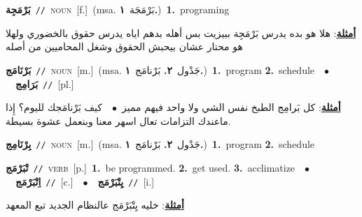 \documentclass[10pt,a4paper,twoside]{article} %
\begin{document}
\begin{multicols}{2}
{\setlength\topsep{0pt}\textbf{\foreignlanguage{arabic}{بَرْمَجِة}}\ {\color{gray}\texttt{//}\color{black}}\ \textsc{noun}\ [f.]\ \color{gray}(msa. \foreignlanguage{arabic}{بَرْمَجَة}~\foreignlanguage{arabic}{\textbf{١.}})\color{black}\ \textbf{1.}~programing\  \begin{flushright}\color{gray}\foreignlanguage{arabic}{\textbf{\underline{\foreignlanguage{arabic}{أمثلة}}}: هلا هو بده يدرس بَرْمَجِة ببيزيت بس أهله بدهم اياه يدرس حقوق بالخضوري ولهلا هو محتار عشان بيحبش الحقوق وشغل المحاميين من أصله}\end{flushright}\color{black}} \vspace{2mm}

{\setlength\topsep{0pt}\textbf{\foreignlanguage{arabic}{بَرْنَامَج}}\ {\color{gray}\texttt{//}\color{black}}\ \textsc{noun}\ [m.]\ \color{gray}(msa. \foreignlanguage{arabic}{جَدْول}~\foreignlanguage{arabic}{\textbf{٢.}}  \foreignlanguage{arabic}{بَرْنامَج}~\foreignlanguage{arabic}{\textbf{١.}})\color{black}\ \textbf{1.}~program  \textbf{2.}~schedule\ \ $\bullet$\ \ \setlength\topsep{0pt}\textbf{\foreignlanguage{arabic}{بَرَامِج}}\ {\color{gray}\texttt{//}\color{black}}\ [pl.]\  \begin{flushright}\color{gray}\foreignlanguage{arabic}{\textbf{\underline{\foreignlanguage{arabic}{أمثلة}}}: كل بَرامِج الطبخ نفس الشي ولا واحد فيهم مميز\ $\bullet$\ \  كيف بَرْنامَجك لليوم؟ إِذا ماعندك التزامات تعال اسهر معنا وبنعمل عشوة بسيطة.}\end{flushright}\color{black}} \vspace{2mm}

{\setlength\topsep{0pt}\textbf{\foreignlanguage{arabic}{بِرْنَامِج}}\ {\color{gray}\texttt{//}\color{black}}\ \textsc{noun}\ [m.]\ \color{gray}(msa. \foreignlanguage{arabic}{جَدْول}~\foreignlanguage{arabic}{\textbf{٢.}}  \foreignlanguage{arabic}{بَرْنامَج}~\foreignlanguage{arabic}{\textbf{١.}})\color{black}\ \textbf{1.}~program  \textbf{2.}~schedule\ } \vspace{2mm}

{\setlength\topsep{0pt}\textbf{\foreignlanguage{arabic}{تْبَرْمَج}}\ {\color{gray}\texttt{//}\color{black}}\ \textsc{verb}\ [p.]\ \textbf{1.}~be programmed.  \textbf{2.}~get used.  \textbf{3.}~acclimatize\ \ $\bullet$\ \ \setlength\topsep{0pt}\textbf{\foreignlanguage{arabic}{اِتْبَرْمَج}}\ {\color{gray}\texttt{//}\color{black}}\ [c.]\ \ $\bullet$\ \ \setlength\topsep{0pt}\textbf{\foreignlanguage{arabic}{يِتْبَرْمَج}}\ {\color{gray}\texttt{//}\color{black}}\ [i.]\  \begin{flushright}\color{gray}\foreignlanguage{arabic}{\textbf{\underline{\foreignlanguage{arabic}{أمثلة}}}: خليه يِتْبَرْمَج عالنظام الجديد تبع المعهد}\end{flushright}\color{black}} \vspace{2mm}


\end{multicols}
\end{document}
